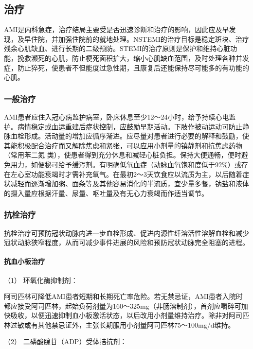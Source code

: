 \subsection{治疗}

AMI是内科急症，治疗结局主要受是否迅速诊断和治疗的影响，因此应及早发现，及早住院，并加强住院前的就地处理。NSTEMI的治疗目标是稳定斑块、治疗残余心肌缺血、进行长期的二级预防。STEMI的治疗原则是保护和维持心脏功能，挽救濒死的心肌，防止梗死面积扩大，缩小心肌缺血范围，及时处理各种并发症，防止猝死，使患者不但能度过急性期，且康复后还能保持尽可能多的有功能的心肌。

\subsubsection{一般治疗}

AMI患者应住入冠心病监护病室，卧床休息至少12～24小时，给予持续心电监护。病情稳定或血运重建后症状控制，应鼓励早期活动。下肢作被动运动可防止静脉血栓形成。活动量的增加应循序渐进。应尽量对患者进行必要的解释和鼓励，使其能积极配合治疗而又解除焦虑和紧张，可以应用小剂量的镇静剂和抗焦虑药物（常用苯二氮{}
类），使患者得到充分休息和减轻心脏负担。保持大便通畅，便时避免用力，如便秘可给予缓泻剂。有明确低氧血症（动脉血氧饱和度低于92\%）或存在左心室功能衰竭时才需补充氧气。在最初2～3天饮食应以流质为主，以后随着症状减轻而逐渐增加粥、面条等及其他容易消化的半流质，宜少量多餐，钠盐和液体的摄入量应根据汗量、尿量、呕吐量及有无心力衰竭而作适当调节。

\subsubsection{抗栓治疗}

抗栓治疗可预防冠状动脉内进一步血栓形成、促进内源性纤溶活性溶解血栓和减少冠状动脉狭窄程度，从而可减少事件进展的风险和预防冠状动脉完全阻塞的进程。

\paragraph{抗血小板治疗}

\hypertarget{text00312.htmlux5cux23CHP10-8-2-3-2-1-1}{}
（1） 环氧化酶抑制剂：

阿司匹林可降低AMI患者短期和长期死亡率危险。若无禁忌证，AMI患者入院时都应接受阿司匹林，起始负荷剂量为160～325mg（非肠溶制剂），首剂应嚼碎可加快吸收，以便迅速抑制血小板激活状态，以后改用小剂量维持治疗。除非对阿司匹林过敏或有其他禁忌证外，主张长期服用小剂量阿司匹林75～100mg/d维持。

\hypertarget{text00312.htmlux5cux23CHP10-8-2-3-2-1-2}{}
（2） 二磷酸腺苷（ADP）受体拮抗剂：

